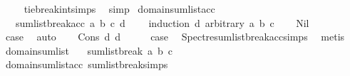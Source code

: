 \begin{isabellebody}
%
\isadelimproof
\ \ %
\endisadelimproof
%
\isatagproof
{}\isamarkupfalse%
\ \ tie{\isacharunderscore}{\kern0pt}break{\isacharunderscore}{\kern0pt}int{\isachardot}{\kern0pt}simps\ \isamarkupfalse%
\ simp%
\endisatagproof
{\isafoldproof}%
%
\isadelimproof
\isanewline
%
\endisadelimproof
\isanewline
{}\isamarkupfalse%
\ domain{\isacharunderscore}{\kern0pt}sumlist{\isacharunderscore}{\kern0pt}acc{\isacharcolon}{\kern0pt}\isanewline
\ \ \ {\isachardoublequoteopen}sumlist{\isacharunderscore}{\kern0pt}break{\isacharunderscore}{\kern0pt}acc\ a\ b\ c\ d\ {\isasymin}\ {\isacharbraceleft}{\kern0pt}{\isacharminus}{\kern0pt}{}\ {\isacharcomma}{\kern0pt}{}\ {\isacharcomma}{\kern0pt}{}{\isacharbraceright}{\kern0pt}{\isachardoublequoteclose}\isanewline
%
\isadelimproof
%
\endisadelimproof
%
\isatagproof
{}\isamarkupfalse%
{\isacharparenleft}{\kern0pt}induction\ d\ arbitrary{\isacharcolon}{\kern0pt}\ a\ b\ c{\isacharparenright}{\kern0pt}\isanewline
\ \ \isamarkupfalse%
\ Nil\isanewline
\ \ \isamarkupfalse%
\ \isamarkupfalse%
\ {\isacharquery}{\kern0pt}case\ \isamarkupfalse%
\ auto\isanewline
{}\isamarkupfalse%
\isanewline
\ \ \isamarkupfalse%
\ {\isacharparenleft}{\kern0pt}Cons\ d{}\ d{\isacharparenright}{\kern0pt}\isanewline
\ \ \isamarkupfalse%
\ \isamarkupfalse%
\ {\isacharquery}{\kern0pt}case\ \isamarkupfalse%
\ Spectre{\isachardot}{\kern0pt}sumlist{\isacharunderscore}{\kern0pt}break{\isacharunderscore}{\kern0pt}acc{\isachardot}{\kern0pt}simps{\isacharparenleft}{\kern0pt}{}{\isacharparenright}{\kern0pt}\ \isamarkupfalse%
\ metis\isanewline
{}\isamarkupfalse%
%
\endisatagproof
{\isafoldproof}%
%
\isadelimproof
\isanewline
%
\endisadelimproof
\isanewline
{}\isamarkupfalse%
\ domain{\isacharunderscore}{\kern0pt}sumlist{\isacharcolon}{\kern0pt}\isanewline
\ \ \ {\isachardoublequoteopen}sumlist{\isacharunderscore}{\kern0pt}break\ a\ b\ c\ \ {\isasymin}\ {\isacharbraceleft}{\kern0pt}{\isacharminus}{\kern0pt}{}\ {\isacharcomma}{\kern0pt}{}\ {\isacharcomma}{\kern0pt}{}{\isacharbraceright}{\kern0pt}{\isachardoublequoteclose}\isanewline
%
\isadelimproof
\ \ %
\endisadelimproof
%
\isatagproof
{}\isamarkupfalse%
\ domain{\isacharunderscore}{\kern0pt}sumlist{\isacharunderscore}{\kern0pt}acc\ sumlist{\isacharunderscore}{\kern0pt}break{\isachardot}{\kern0pt}simps{\isacharparenleft}{\kern0pt}{}{\isacharparenright}{\kern0pt}\isanewline

\end{isabellebody}
